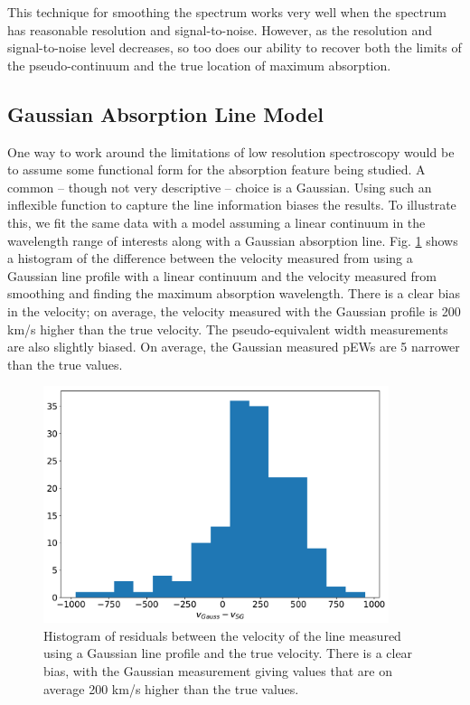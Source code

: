 

This technique for smoothing the spectrum works very well when the spectrum has reasonable resolution and signal-to-noise. However, as the resolution and signal-to-noise level decreases, so too does our ability to recover both the limits of the pseudo-continuum and the true location of maximum absorption. 

\subsection{Gaussian Absorption Line Model}
One way to work around the limitations of low resolution spectroscopy would be to assume some functional form for the absorption feature being studied. A common -- though not very descriptive -- choice is a Gaussian. Using such an inflexible function to capture the line information biases the results. To illustrate this, we fit the same data with a model assuming a linear continuum in the wavelength range of interests along with a Gaussian absorption line. Fig. \ref{gauss_bias} shows a histogram of the difference between the velocity measured from using a Gaussian line profile with a linear continuum and the velocity measured from smoothing and finding the maximum absorption wavelength. There is a clear bias in the velocity; on average, the velocity measured with the Gaussian profile is 200 km/s higher than the true velocity. The pseudo-equivalent width measurements are also slightly biased. On average, the Gaussian measured pEWs are 5 \angstrom\; narrower than the true values.

\begin{figure}[htbp]
    \centering
    \includegraphics[width=0.9\textwidth]{figures/si_feat_pca/gauss_bias.pdf}
    \caption{Histogram of residuals between the velocity of the \siliconii\; line measured using a Gaussian line profile and the true velocity. There is a clear bias, with the Gaussian measurement giving values that are on average 200 km/s higher than the true values.}
    \label{gauss_bias}
\end{figure}


